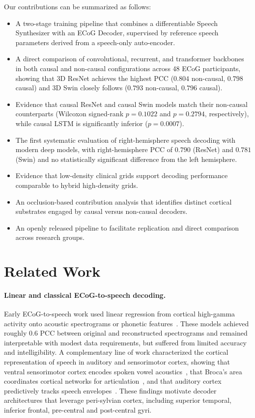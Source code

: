 \documentclass[10pt]{article}
\begin{document}
Our contributions can be summarized as follows:
\begin{itemize}
\item A two-stage training pipeline that combines a differentiable Speech Synthesizer with an ECoG Decoder, supervised by reference speech parameters derived from a speech-only auto-encoder.
\item A direct comparison of convolutional, recurrent, and transformer backbones in both causal and non-causal configurations across 48 ECoG participants, showing that 3D ResNet achieves the highest PCC ($0.804$ non-causal, $0.798$ causal) and 3D Swin closely follows ($0.793$ non-causal, $0.796$ causal).
\item Evidence that causal ResNet and causal Swin models match their non-causal counterparts (Wilcoxon signed-rank $p=0.1022$ and $p=0.2794$, respectively), while causal LSTM is significantly inferior ($p=0.0007$).
\item The first systematic evaluation of right-hemisphere speech decoding with modern deep models, with right-hemisphere PCC of $0.790$ (ResNet) and $0.781$ (Swin) and no statistically significant difference from the left hemisphere.
\item Evidence that low-density clinical grids support decoding performance comparable to hybrid high-density grids.
\item An occlusion-based contribution analysis that identifies distinct cortical substrates engaged by causal versus non-causal decoders.
\item An openly released pipeline to facilitate replication and direct comparison across research groups.
\end{itemize}

\section{Related Work}

\paragraph{Linear and classical ECoG-to-speech decoding.}
Early ECoG-to-speech work used linear regression from cortical high-gamma activity onto acoustic spectrograms or phonetic features~\cite{pasley2012reconstructing,mugler2014direct,herff2015brain}. These models achieved roughly $0.6$ PCC between original and reconstructed spectrograms and remained interpretable with modest data requirements, but suffered from limited accuracy and intelligibility. A complementary line of work characterized the cortical representation of speech in auditory and sensorimotor cortex, showing that ventral sensorimotor cortex encodes spoken vowel acoustics~\cite{bouchard2014control}, that Broca's area coordinates cortical networks for articulation~\cite{flinker2015redefining,wang2021dynamics}, and that auditory cortex predictively tracks speech envelopes~\cite{golumbic2013visual,yildiz2016predictive}. These findings motivate decoder architectures that leverage peri-sylvian cortex, including superior temporal, inferior frontal, pre-central and post-central gyri.
\end{document}
